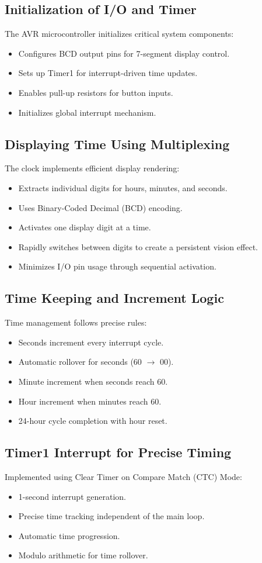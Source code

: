 \documentclass{article}
\begin{document}
\subsection{Initialization of I/O and Timer}
The AVR microcontroller initializes critical system components:
\begin{itemize}
    \item Configures BCD output pins for 7-segment display control.
    \item Sets up Timer1 for interrupt-driven time updates.
    \item Enables pull-up resistors for button inputs.
    \item Initializes global interrupt mechanism.
\end{itemize}

\subsection{Displaying Time Using Multiplexing}
The clock implements efficient display rendering:
\begin{itemize}
    \item Extracts individual digits for hours, minutes, and seconds.
    \item Uses Binary-Coded Decimal (BCD) encoding.
    \item Activates one display digit at a time.
    \item Rapidly switches between digits to create a persistent vision effect.
    \item Minimizes I/O pin usage through sequential activation.
\end{itemize}

\subsection{Time Keeping and Increment Logic}
Time management follows precise rules:
\begin{itemize}
    \item Seconds increment every interrupt cycle.
    \item Automatic rollover for seconds (60 $\rightarrow$ 00).
    \item Minute increment when seconds reach 60.
    \item Hour increment when minutes reach 60.
    \item 24-hour cycle completion with hour reset.
\end{itemize}

\subsection{Timer1 Interrupt for Precise Timing}
Implemented using Clear Timer on Compare Match (CTC) Mode:
\begin{itemize}
    \item 1-second interrupt generation.
    \item Precise time tracking independent of the main loop.
    \item Automatic time progression.
    \item Modulo arithmetic for time rollover.
\end{itemize}
\end{document}
